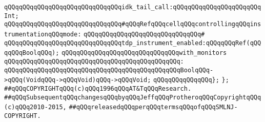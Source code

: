 \verb|qQQqqQQqqQQqqQQqqQQqqQQqqQQqqQQqidk_tail_call:qQQqqQQqqQQqqQQqqQQqqQQqInt;|\newline
\newline
\verb|qQQqqQQqqQQqqQQqqQQqqQQqqQQqqQQq#qQQqRefqQQqcellqQQqcontrollingqQQqinstrumentationqQQqmode:|\newline
\verb|qQQqqQQqqQQqqQQqqQQqqQQqqQQqqQQq#|\newline
\verb|qQQqqQQqqQQqqQQqqQQqqQQqqQQqqQQqtdp_instrument_enabled:qQQqqQQqRef(qQQqqQQqBoolqQQq);|\newline
\newline
\verb|qQQqqQQqqQQqqQQqqQQqqQQqqQQqqQQqwith_monitors|\newline
\verb|qQQqqQQqqQQqqQQqqQQqqQQqqQQqqQQqqQQqqQQqqQQqqQQq:|\newline
\verb|qQQqqQQqqQQqqQQqqQQqqQQqqQQqqQQqqQQqqQQqqQQqqQQqBoolqQQq->qQQq(VoidqQQq->qQQqVoid)qQQq->qQQqVoid;|\newline
\verb|qQQqqQQqqQQqqQQq};|\newline
\verb|};|\newline
\newline
\newline
\verb|##qQQqCOPYRIGHTqQQq(c)qQQq1996qQQqAT&TqQQqResearch.|\newline
\verb|##qQQqSubsequentqQQqchangesqQQqbyqQQqJeffqQQqProtheroqQQqCopyrightqQQq(c)qQQq2010-2015,|\newline
\verb|##qQQqreleasedqQQqperqQQqtermsqQQqofqQQqSMLNJ-COPYRIGHT.|\newline

